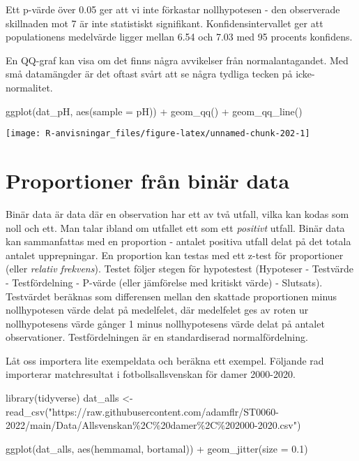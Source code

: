\documentclass[
]{book}
\newenvironment{Shaded}{\begin{snugshade}}{\end{snugshade}}
\newcommand{\AttributeTok}[1]{\textcolor[rgb]{0.77,0.63,0.00}{#1}}
\newcommand{\FloatTok}[1]{\textcolor[rgb]{0.00,0.00,0.81}{#1}}
\newcommand{\FunctionTok}[1]{\textcolor[rgb]{0.00,0.00,0.00}{#1}}
\newcommand{\NormalTok}[1]{#1}
\newcommand{\OtherTok}[1]{\textcolor[rgb]{0.56,0.35,0.01}{#1}}
\newcommand{\SpecialCharTok}[1]{\textcolor[rgb]{0.00,0.00,0.00}{#1}}
\newcommand{\StringTok}[1]{\textcolor[rgb]{0.31,0.60,0.02}{#1}}
\theoremstyle{definition}
\theoremstyle{definition}
\theoremstyle{definition}
\theoremstyle{definition}
\theoremstyle{remark}
\begin{document}
Ett p-värde över 0.05 ger att vi inte förkastar nollhypotesen - den observerade skillnaden mot 7 är inte statistiskt signifikant. Konfidensintervallet ger att populationens medelvärde ligger mellan 6.54 och 7.03 med 95 procents konfidens.

En QQ-graf kan visa om det finns några avvikelser från normalantagandet. Med små datamängder är det oftast svårt att se några tydliga tecken på icke-normalitet.

\begin{Shaded}
\begin{Highlighting}[]
\FunctionTok{ggplot}\NormalTok{(dat\_pH, }\FunctionTok{aes}\NormalTok{(}\AttributeTok{sample =}\NormalTok{ pH)) }\SpecialCharTok{+}
  \FunctionTok{geom\_qq}\NormalTok{() }\SpecialCharTok{+}
  \FunctionTok{geom\_qq\_line}\NormalTok{()}
\end{Highlighting}
\end{Shaded}

\begin{center}\texttt{[image: R-anvisningar\_files/figure-latex/unnamed-chunk-202-1]} \end{center}

\hypertarget{proportioner-fruxe5n-binuxe4r-data}{%
\section{Proportioner från binär data}\label{proportioner-fruxe5n-binuxe4r-data}}

Binär data är data där en observation har ett av två utfall, vilka kan kodas som noll och ett. Man talar ibland om utfallet ett som ett \emph{positivt} utfall. Binär data kan sammanfattas med en proportion - antalet positiva utfall delat på det totala antalet upprepningar. En proportion kan testas med ett z-test för proportioner (eller \emph{relativ frekvens}). Testet följer stegen för hypotestest (Hypoteser - Testvärde - Testfördelning - P-värde (eller jämförelse med kritiskt värde) - Slutsats). Testvärdet beräknas som differensen mellan den skattade proportionen minus nollhypotesen värde delat på medelfelet, där medelfelet ges av roten ur nollhypotesens värde gånger 1 minus nollhypotesens värde delat på antalet observationer. Testfördelningen är en standardiserad normalfördelning.

Låt oss importera lite exempeldata och beräkna ett exempel. Följande rad importerar matchresultat i fotbollsallsvenskan för damer 2000-2020.

\begin{Shaded}
\begin{Highlighting}[]
\FunctionTok{library}\NormalTok{(tidyverse)}
\NormalTok{dat\_alls }\OtherTok{\textless{}{-}} \FunctionTok{read\_csv}\NormalTok{(}\StringTok{"https://raw.githubusercontent.com/adamflr/ST0060{-}2022/main/Data/Allsvenskan\%2C\%20damer\%2C\%202000{-}2020.csv"}\NormalTok{)}

\FunctionTok{ggplot}\NormalTok{(dat\_alls, }\FunctionTok{aes}\NormalTok{(hemmamal, bortamal)) }\SpecialCharTok{+}
  \FunctionTok{geom\_jitter}\NormalTok{(}\AttributeTok{size =} \FloatTok{0.1}\NormalTok{)}
\end{Highlighting}
\end{Shaded}
\end{document}
